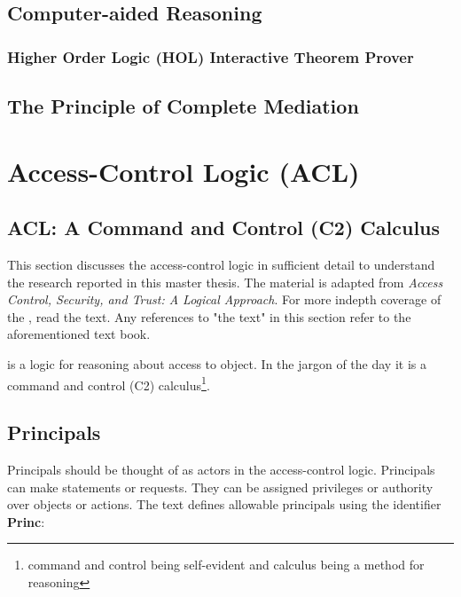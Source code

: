 \documentclass[../../main/main.tex]{subfiles}
\begin{document}
\subsection{Computer-aided Reasoning}\label{ssec:computeraidedreasoning}

\subsubsection{Higher Order Logic (HOL) Interactive Theorem Prover}\label{ssec:pcompletemediation}



\subsection{The Principle of Complete Mediation}\label{ssec:pcompletemediation}

\section{Access-Control Logic (ACL)} \label{sec:acl}
\subsection{ACL: A Command and Control (C2) Calculus} \label{ssec:aclc2}
This section discusses the access-control logic in sufficient detail to understand the research reported in this master thesis.  The material is adapted from \textit{Access Control, Security, and Trust: A Logical Approach}\cite{ChinOlder}.  For more indepth coverage of the , read the text.  Any references to "the text" in this section refer to the aforementioned text book.

 is a logic for reasoning about access to object.  In the jargon of the day it is a command and control (C2) calculus\footnote{command and control being self-evident and calculus being a method for reasoning}. 

\subsection{Principals}\label{ssec:principals}
Principals should be thought of as actors in the access-control logic.  Principals can make statements or requests.  They can be assigned privileges or authority over objects or actions.  The text defines allowable principals using the identifier \textbf{Princ}:
\end{document}
